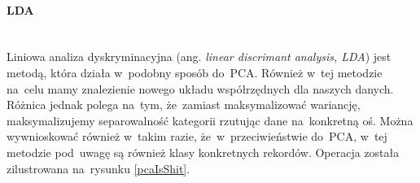 \paragraph{LDA}\mbox{}\\
Liniowa analiza dyskryminacyjna (ang. \textit{linear discrimant analysis, LDA})\cite{ldaBriefTutorial} jest metodą, która działa w~podobny sposób do~PCA. Również w~tej metodzie na~celu mamy znalezienie nowego układu współrzędnych dla naszych danych. Różnica jednak polega na~tym, że~zamiast maksymalizować wariancję, maksymalizujemy separowalność kategorii rzutując dane na~konkretną oś. Można wywnioskować również w~takim razie, że~w~przeciwieństwie do~PCA, w~tej metodzie pod~uwagę są również klasy konkretnych rekordów. Operacja została zilustrowana na~rysunku \ref{pcaIsShit}. 


